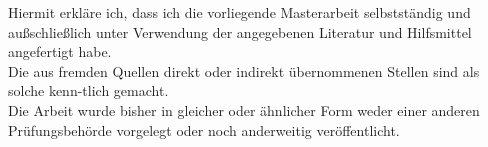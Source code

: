 \documentclass[thesis.tex]{subfiles}
\newcommand{\doublesignature}[3]{%
  \parbox{\textwidth}{
    \parbox{7cm}{
      \rule{6cm}{1pt}\\
       #1
    }
    \hfill
    \parbox{7cm}{
      \rule{6cm}{1pt}\\
      #2
    }
  }
}
\begin{document}


Hiermit erkläre ich, dass ich die vorliegende Masterarbeit selbstständig und außschließlich unter Verwendung der angegebenen Literatur und Hilfsmittel angefertigt habe.\\
Die aus fremden Quellen direkt oder indirekt übernommenen Stellen sind als solche kenn-tlich gemacht.\\

Die Arbeit wurde bisher in gleicher oder ähnlicher Form weder einer anderen Prüfungsbehörde vorgelegt oder noch anderweitig veröffentlicht.
\vspace{100pt}


\newpage
\end{document}
